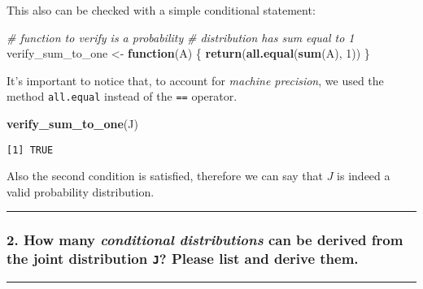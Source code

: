 \documentclass[
]{article}
\newenvironment{Shaded}{\begin{snugshade}}{\end{snugshade}}
\newcommand{\CommentTok}[1]{\textcolor[rgb]{0.56,0.35,0.01}{\textit{#1}}}
\newcommand{\ControlFlowTok}[1]{\textcolor[rgb]{0.13,0.29,0.53}{\textbf{#1}}}
\newcommand{\DecValTok}[1]{\textcolor[rgb]{0.00,0.00,0.81}{#1}}
\newcommand{\FunctionTok}[1]{\textcolor[rgb]{0.13,0.29,0.53}{\textbf{#1}}}
\newcommand{\NormalTok}[1]{#1}
\newcommand{\OtherTok}[1]{\textcolor[rgb]{0.56,0.35,0.01}{#1}}
\begin{document}
This also can be checked with a simple conditional statement:

\begin{Shaded}
\begin{Highlighting}[]
\CommentTok{\# function to verify is a probability}
\CommentTok{\# distribution has sum equal to 1}
\NormalTok{verify\_sum\_to\_one }\OtherTok{\textless{}{-}} \ControlFlowTok{function}\NormalTok{(A) \{}
    \FunctionTok{return}\NormalTok{(}\FunctionTok{all.equal}\NormalTok{(}\FunctionTok{sum}\NormalTok{(A), }\DecValTok{1}\NormalTok{))}
\NormalTok{\}}
\end{Highlighting}
\end{Shaded}

It's important to notice that, to account for \emph{machine precision},
we used the method \texttt{all.equal} instead of the \texttt{==}
operator.

\begin{Shaded}
\begin{Highlighting}[]
\FunctionTok{verify\_sum\_to\_one}\NormalTok{(J)}
\end{Highlighting}
\end{Shaded}

\begin{verbatim}
[1] TRUE
\end{verbatim}

Also the second condition is satisfied, therefore we can say that \(J\)
is indeed a valid probability distribution.

\begin{center}\rule{0.5\linewidth}{0.5pt}\end{center}

\bigskip

\hypertarget{how-many-conditional-distributions-can-be-derived-from-the-joint-distribution-j-please-list-and-derive-them.}{%
\subsubsection{\texorpdfstring{2. How many \emph{conditional
distributions} can be derived from the joint distribution \texttt{J}?
Please list and derive
them.}{2. How many conditional distributions can be derived from the joint distribution J? Please list and derive them.}}\label{how-many-conditional-distributions-can-be-derived-from-the-joint-distribution-j-please-list-and-derive-them.}}

\begin{center}\rule{0.5\linewidth}{0.5pt}\end{center}
\end{document}
